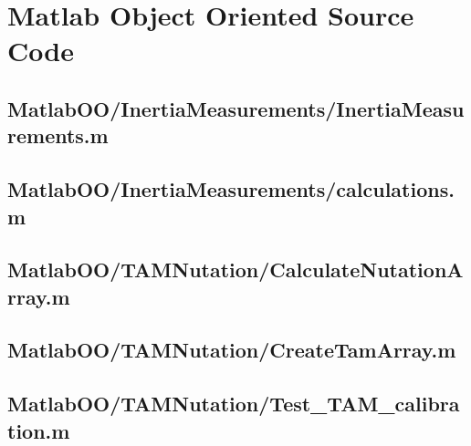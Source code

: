 
\chapter{Matlab Object Oriented Source Code}\label{ch:MatlabObjectOrientedSourceCode}

\linespread{1}

\pagebreak
\section{MatlabOO/InertiaMeasurements/InertiaMeasurements.m}\label{code:MatlabOO/InertiaMeasurements/InertiaMeasurements.m}


\pagebreak
\section{MatlabOO/InertiaMeasurements/calculations.m}\label{code:MatlabOO/InertiaMeasurements/calculations.m}


\pagebreak
\section{MatlabOO/TAMNutation/CalculateNutationArray.m}\label{code:MatlabOO/TAMNutation/CalculateNutationArray.m}


\pagebreak
\section{MatlabOO/TAMNutation/CreateTamArray.m}\label{code:MatlabOO/TAMNutation/CreateTamArray.m}


\pagebreak
\section{MatlabOO/TAMNutation/Test\_TAM\_calibration.m}\label{code:MatlabOO/TAMNutation/Test_TAM_calibration.m}


